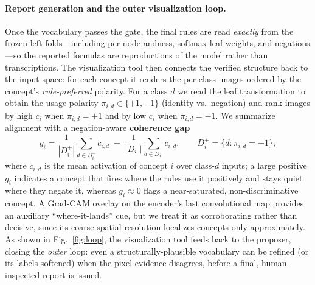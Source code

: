 \paragraph{Report generation and the outer visualization loop.}
Once the vocabulary passes the gate, the final rules are read \emph{exactly} from
the frozen left-folds---including per-node andness, softmax leaf weights, and
negations---so the reported formulas are reproductions of the model rather than
transcriptions. The visualization tool then connects the verified structure back to
the input space: for each concept it renders the per-class images ordered by the
concept's \emph{rule-preferred} polarity. For a class $d$ we read the leaf
transformation to obtain the usage polarity $\pi_{i,d}\in\{+1,-1\}$ (identity vs.\
negation) and rank images by high $c_i$ when $\pi_{i,d}{=}{+}1$ and by low $c_i$
when $\pi_{i,d}{=}{-}1$. We summarize alignment with a negation-aware
\textbf{coherence gap}
\begin{equation}
g_i=\frac{1}{|D_i^{+}|}\sum_{d\in D_i^{+}}\bar c_{i,d}
\;-\;\frac{1}{|D_i^{-}|}\sum_{d\in D_i^{-}}\bar c_{i,d},
\qquad D_i^{\pm}=\{d:\pi_{i,d}={\pm}1\},
\end{equation}
where $\bar c_{i,d}$ is the mean activation of concept $i$ over class-$d$ inputs;
a large positive $g_i$ indicates a concept that fires where the rules use it
positively and stays quiet where they negate it, whereas $g_i\!\approx\!0$ flags a
near-saturated, non-discriminative concept. A Grad-CAM overlay on the encoder's
last convolutional map provides an auxiliary ``where-it-lands'' cue, but we treat
it as corroborating rather than decisive, since its coarse spatial resolution
localizes concepts only approximately. As shown in Fig.~\ref{fig:loop}, the
visualization tool feeds back to the proposer, closing the \emph{outer} loop: even a
structurally-plausible vocabulary can be refined (or its labels softened) when the
pixel evidence disagrees, before a final, human-inspected report is issued.
